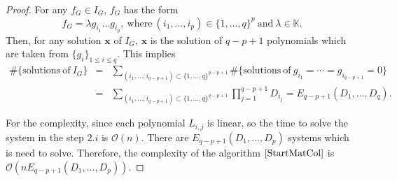 \documentclass[11pt]{article}
\numberwithin{Property}{section}
\numberwithin{Theorem}{section}
\numberwithin{Proposition}{section}
\numberwithin{Lemma}{section}
\numberwithin{Corollary}{section}
\numberwithin{Definition}{section}
\numberwithin{Remark}{section}
\numberwithin{Conjecture}{section}
\numberwithin{Problem}{section}
\numberwithin{Example}{section}
\numberwithin{Claim}{section}
\renewcommand{\leq}{\leqslant}
\newcommand{\bigO}[1]{\mathcal{O}(#1)} %
\newcommand{\field}{\mathbb{K}} %
\begin{document}
\begin{proof}
For any $f_G \in I_G$, $f_G$ has the form 
\[
f_G = \lambda g_{i_1}\ldots g_{i_p}, \ \mathrm{where} \ (i_1, \ldots, i_p) \in \{1, \ldots,q\}^{p} \ \mathrm{and} \ \lambda \in \field.
\] Then, for any solution $\mathbf{x}$ of $I_G$, $\mathbf{x}$ is the solution of $q-p+1$ polynomials which are taken from $\{g_i\}_{1 \leq i \leq q}$. This implies 
\begin{eqnarray*}
\#\{\mathrm{solutions \ of \ } I_G \} &=& \sum_{(i_1, \ldots, i_{q-p+1}) \subset \{1, \ldots,q\}^{q-p+1}} \#
\{\mathrm{solutions \ of \ }  g_{i_1} = \cdots = g_{i_{q-p+1}} = 0  \} \\
&=& \sum_{(i_1, \ldots, i_{q-p+1}) \subset \{1, \ldots,q\}^{q-p+1}}\prod_{j =1}^{q-p+1}D_{i_j} = E_{q-p+1}(D_1, \ldots, D_q). 
\end{eqnarray*}

For the complexity, since each polynomial $L_{i,j}$ is linear, so the time to solve the system in the step $2.i$ is $\bigO{n}$. There are $E_{q-p+1}(D_1, \ldots, D_p)$ systems which is need to solve. Therefore, the complexity of the algorithm $\ref{StartMatCol}$ is $\bigO{nE_{q-p+1}(D_1, \ldots, D_p)}$.
\end{proof}
\end{document}
